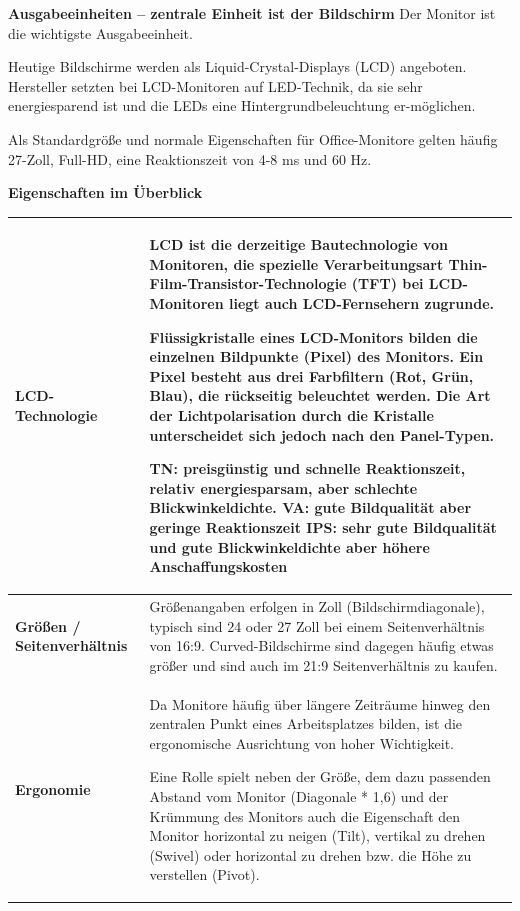 \documentclass[10pt]{article}
\begin{document}
\begin{flushleft}
\textbf{Ausgabeeinheiten – zentrale Einheit ist der Bildschirm}
Der Monitor ist die wichtigste Ausgabeeinheit.

Heutige Bildschirme werden als Liquid-Crystal-Displays (LCD) angeboten. Hersteller setzten bei LCD-Monitoren auf LED-Technik, da sie sehr energiesparend ist und die LEDs eine Hintergrundbeleuchtung er-möglichen.

Als Standardgröße und normale Eigenschaften für Office-Monitore gelten häufig 27-Zoll, Full-HD, eine Reaktionszeit von 4-8 ms und 60 Hz.

\textbf{Eigenschaften im Überblick}
\begin{longtable}{|p{}|p{}|}
    \hline
    \textbf{LCD-Technologie}&
    LCD ist die derzeitige Bautechnologie von Monitoren, die spezielle Verarbeitungsart Thin-Film-Transistor-Technologie (TFT) bei LCD-Monitoren liegt auch LCD-Fernsehern zugrunde.
    
    Flüssigkristalle eines LCD-Monitors bilden die einzelnen Bildpunkte (Pixel) des Monitors. Ein Pixel besteht aus drei Farbfiltern (Rot, Grün, Blau), die rückseitig beleuchtet werden. Die Art der Lichtpolarisation durch die Kristalle unterscheidet sich jedoch nach den Panel-Typen.
    \begin{outline}
        \1 TN: preisgünstig und schnelle Reaktionszeit, relativ energiesparsam, aber schlechte Blickwinkeldichte.
        \1 VA: gute Bildqualität aber geringe Reaktionszeit
        \1 IPS: sehr gute Bildqualität und gute Blickwinkeldichte aber höhere Anschaffungskosten   
    \end{outline}
    \\\hline

    \textbf{Größen / Seitenverhältnis}&
    Größenangaben erfolgen in Zoll (Bildschirmdiagonale), typisch sind 24 oder 27 Zoll bei einem Seitenverhältnis von 16:9. Curved-Bildschirme sind dagegen häufig etwas größer und sind auch im 21:9 Seitenverhältnis zu kaufen.
    \\\hline

    \textbf{Ergonomie}&
    Da Monitore häufig über längere Zeiträume hinweg den zentralen Punkt eines Arbeitsplatzes bilden, ist die ergonomische Ausrichtung von hoher Wichtigkeit.
    
    Eine Rolle spielt neben der Größe, dem dazu passenden Abstand vom Monitor (Diagonale * 1,6) und der Krümmung des Monitors auch die Eigenschaft den Monitor horizontal zu neigen (Tilt), vertikal zu drehen (Swivel) oder horizontal zu drehen bzw. die Höhe zu verstellen (Pivot).
    

\end{longtable}
\end{flushleft}
\end{document}
